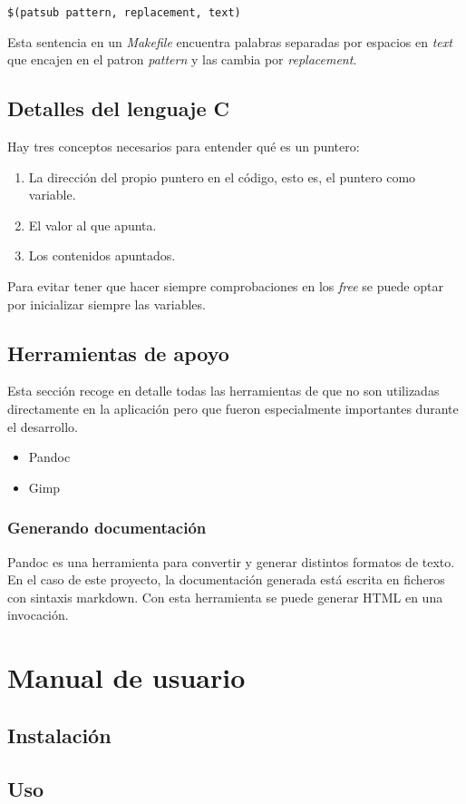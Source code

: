 \begin{verbatim}
$(patsub pattern, replacement, text)
\end{verbatim}

Esta sentencia en un \emph{Makefile} encuentra palabras separadas por espacios en \emph{text} que encajen en el patron \emph{pattern} y las cambia por \emph{replacement}.

\section{Detalles del lenguaje C}

Hay tres conceptos necesarios para entender qué es un puntero:

\begin{enumerate}
    \item La dirección del propio puntero en el código, esto es, el puntero como variable.
    \item El valor al que apunta.
    \item Los contenidos apuntados.
\end{enumerate}

Para evitar tener que hacer siempre comprobaciones en los \emph{free} se puede optar por inicializar siempre las variables.

\section{Herramientas de apoyo}

Esta sección recoge en detalle todas las herramientas de que no son utilizadas directamente en la aplicación pero que fueron especialmente importantes durante el desarrollo.

\begin{itemize}
    \item Pandoc
    \item Gimp
\end{itemize}

\subsection{Generando documentación}
Pandoc es una herramienta para convertir y generar distintos formatos de texto. En el caso de este proyecto, la documentación generada está escrita en ficheros con sintaxis markdown. Con esta herramienta se puede generar HTML en una invocación.


\chapter{Manual de usuario}
\label{chap:manual-usuario}

\section{Instalación}

\section{Uso}